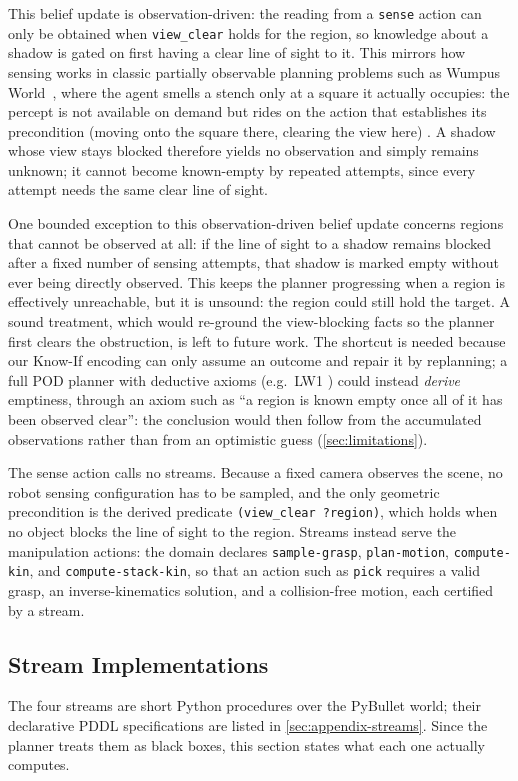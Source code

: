 This belief update is observation-driven: the reading from a \texttt{sense} action can only be obtained when \texttt{view\_clear} holds for the region, so knowledge about a shadow is gated on first having a clear line of sight to it. This mirrors how sensing works in classic partially observable planning problems such as Wumpus World~\cite{russell2010artificial}, where the agent smells a stench only at a square it actually occupies: the percept is not available on demand but rides on the action that establishes its precondition (moving onto the square there, clearing the view here) \cite{albore2009translation, geffner2013concise}. A shadow whose view stays blocked therefore yields no observation and simply remains unknown; it cannot become known-empty by repeated attempts, since every attempt needs the same clear line of sight.

One bounded exception to this observation-driven belief update concerns regions that cannot be observed at all: if the line of sight to a shadow remains blocked after a fixed number of sensing attempts, that shadow is marked empty without ever being directly observed. This keeps the planner progressing when a region is effectively unreachable, but it is unsound: the region could still hold the target. A sound treatment, which would re-ground the view-blocking facts so the planner first clears the obstruction, is left to future work. The shortcut is needed because our Know-If encoding can only assume an outcome and repair it by replanning; a full POD planner with deductive axioms (e.g.\ LW1 \cite{bonet2014flexible}) could instead \emph{derive} emptiness, through an axiom such as ``a region is known empty once all of it has been observed clear'': the conclusion would then follow from the accumulated observations rather than from an optimistic guess (\cref{sec:limitations}).

The sense action calls no streams. Because a fixed camera observes the scene, no robot sensing configuration has to be sampled, and the only geometric precondition is the derived predicate \texttt{(view\_clear ?region)}, which holds when no object blocks the line of sight to the region. Streams instead serve the manipulation actions: the domain declares \texttt{sample-grasp}, \texttt{plan-motion}, \texttt{compute-kin}, and \texttt{compute-stack-kin}, so that an action such as \texttt{pick} requires a valid grasp, an inverse-kinematics solution, and a collision-free motion, each certified by a stream.

\subsection{Stream Implementations}
\label{subsec:stream-impls}
The four streams are short Python procedures over the PyBullet world; their declarative PDDL specifications are listed in \cref{sec:appendix-streams}. Since the planner treats them as black boxes, this section states what each one actually computes.

